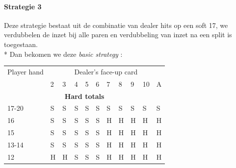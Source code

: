 \documentclass[conference]{IEEEtran}
\begin{document}
\paragraph{Strategie 3}

Deze strategie bestaat uit de combinatie van dealer hits op een soft 17, we verdubbelen de inzet bij alle paren en verdubbeling van inzet na een split is toegestaan.\\*
Dan bekomen we deze \textit{basic strategy} :

\begin{table}[ht]
\tiny
\centering
\begin{tabular}{|l|l|l|l|l|l|l|l|l|l|l|}
\hline

{Player hand} & \multicolumn{10}{c|}{Dealer's face-up card}     \\ \cline{2-11} 
                             & 2 & 3 & 4 & 5 & 6 & 7 & 8 & 9 & 10 & A \\ \hline
\multicolumn{11}{|c|}{\textbf{Hard totals}}                           \\ \hline
17-20       								 & \cellcolor{red!75}S & \cellcolor{red!75}S & \cellcolor{red!75}S & \cellcolor{red!75}S & \cellcolor{red!75}S & \cellcolor{red!75}S & \cellcolor{red!75}S & \cellcolor{red!75}S & \cellcolor{red!75}S & \cellcolor{red!75}S  \\ \hline
16                           & \cellcolor{red!75}S & \cellcolor{red!75}S & \cellcolor{red!75}S & \cellcolor{red!75}S & \cellcolor{red!75}S & \cellcolor{green!50}H & \cellcolor{green!50}H & \cellcolor{green!50}H & \cellcolor{green!50}H & \cellcolor{green!50}H  \\ \hline
15                           & \cellcolor{red!75}S & \cellcolor{red!75}S & \cellcolor{red!75}S & \cellcolor{red!75}S & \cellcolor{red!75}S & \cellcolor{green!50}H & \cellcolor{green!50}H & \cellcolor{green!50}H & \cellcolor{green!50}H & \cellcolor{green!50}H  \\ \hline
13-14                        & \cellcolor{red!75}S & \cellcolor{red!75}S & \cellcolor{red!75}S & \cellcolor{red!75}S & \cellcolor{red!75}S & \cellcolor{green!50}H & \cellcolor{green!50}H & \cellcolor{green!50}H & \cellcolor{green!50}H & \cellcolor{green!50}H  \\ \hline
12                           & \cellcolor{green!50}H & \cellcolor{green!50}H & \cellcolor{red!75}S & \cellcolor{red!75}S & \cellcolor{red!75}S & \cellcolor{green!50}H & \cellcolor{green!50}H & \cellcolor{green!50}H & \cellcolor{green!50}H & \cellcolor{green!50}H  \\ \hline

\end{tabular}
\end{table}
\end{document}
